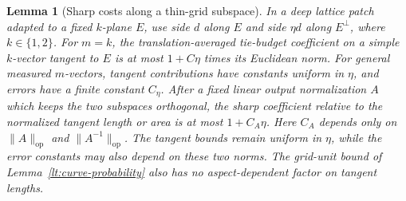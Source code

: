 \documentclass[11pt]{article}
\numberwithin{equation}{section}
\newtheorem{lemma}[theorem]{Lemma}
\theoremstyle{definition}
\theoremstyle{remark}
\begin{document}
\begin{lemma}[Sharp costs along a thin-grid subspace]
\label{lt:sharp-grid}
In a deep lattice patch adapted to a fixed $k$-plane $E$, use side
$d$ along $E$ and side $\eta d$ along $E^\perp$, where
$k\in\{1,2\}$.  For $m=k$, the translation-averaged tie-budget
coefficient on a simple $k$-vector tangent to $E$ is at most
$1+C\eta$ times its Euclidean norm.  For general measured
$m$-vectors, tangent contributions have constants uniform in
$\eta$, and errors have a finite constant $C_\eta$.
After a fixed linear output normalization $A$ which keeps the two
subspaces orthogonal, the sharp coefficient relative to the normalized
tangent length or area is at most $1+C_A\eta$. Here $C_A$ depends only on
$\|A\|_{\mathrm{op}}$ and $\|A^{-1}\|_{\mathrm{op}}$. The tangent bounds remain
uniform in $\eta$, while the error constants may also depend on these
two norms.
The grid-unit bound of Lemma~\ref{lt:curve-probability} also has no
aspect-dependent factor on tangent lengths.
\end{lemma}
\end{document}
